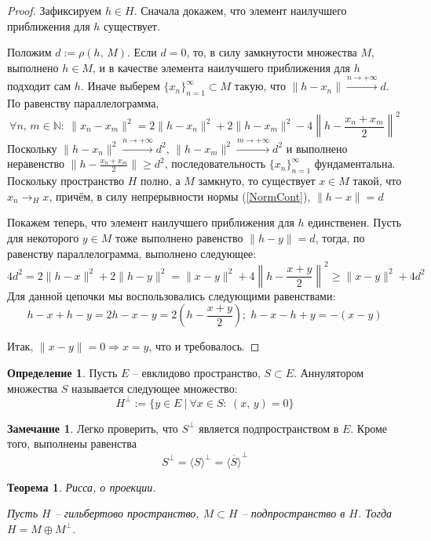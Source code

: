 \documentclass[a4paper,12pt]{article}
\renewcommand{\geq}{\ensuremath{\geqslant}}
\theoremstyle{plain}
\newtheorem{theorem}{Теорема}[section]
\theoremstyle{definition}
\newtheorem{definition}{Определение}[section]
\newtheorem*{note}{Замечание}
\theoremstyle{remark}
\begin{document}
\begin{proof}
	Зафиксируем $h \in H$. Сначала докажем, что элемент наилучшего приближения для $h$ существует.

	Положим $d := \rho(h,\, M)$. Если $d = 0$, то, в силу замкнутости множества $M$, выполнено $h \in M$, и в качестве элемента наилучшего приближения для $h$ подходит сам $h$. Иначе выберем $\{x_n\}_{n = 1}^\infty \subset M$ такую, что $\|h - x_n\| \overset{n \to +\infty}{\to} d$. По равенству параллелограмма,
	\[
		\forall n,\,m \in \mathbb{N} :\: \|x_n - x_m\|^2 = 2 \|h - x_n\|^2 + 2\|h - x_m\|^2 - 4\left\|h - \frac{x_n + x_m}{2}\right\|^2
	\]
	Поскольку $\|h - x_n\|^2 \overset{n \to +\infty}{\to} d^2,\, \|h - x_m\|^2 \overset{m \to +\infty}{\to} d^2$ и выполнено неравенство $\|h - \frac{x_n + x_m}{2}\| \geq d^2$, последовательность $\{x_n\}_{n = 1}^\infty$ фундаментальна. Поскольку пространство $H$ полно, а $M$ замкнуто, то существует $x \in M$ такой, что $x_n \to_H x$, причём, в силу непрерывности нормы (\ref{NormCont}), $\|h - x\| = d$

	Покажем теперь, что элемент наилучшего приближения для $h$ единственен. Пусть для некоторого $y \in M$ тоже выполнено равенство $\|h - y\| = d$, тогда, по равенству параллелограмма, выполнено следующее:
	\[
		4d^2= 2\|h - x\|^2 + 2\|h - y\|^2 = \|x - y\|^2 + 4\left\|h - \frac{x + y}{2}\right\|^2 \geq \|x - y\|^2 + 4d^2
	\]
	Для данной цепочки мы воспользовались следующими равенствами:
	\[
		h - x + h - y = 2h - x - y = 2\left(h - \frac{x + y}{2}\right);\; h - x - h + y = -(x - y)
	\]

	Итак, $\|x - y\| =0 \Rightarrow x = y$, что и требовалось.
\end{proof}

\begin{definition}
	Пусть $E$ -- евклидово пространство, $S \subset E$. Аннулятором множества $S$ называется следующее множество:
	\[
		H^\bot := \{y \in E \:\vert\: \forall x \in S :\: (x,\,y) = 0 \}
	\]
\end{definition}

\begin{note}
  Легко проверить, что $S^\bot$ является подпространством в $E$. Кроме того, выполнены равенства
  \[
    S^\bot = \langle S\rangle^\bot = \overline{\langle S\rangle}^\bot
  \]
\end{note}

\begin{theorem}
	Рисса, о проекции.

	Пусть $H$ -- гильбертово пространство, $M \subset H$ -- подпространство в $H$. Тогда $H = M \oplus M^\bot$.
\end{theorem}
\end{document}
